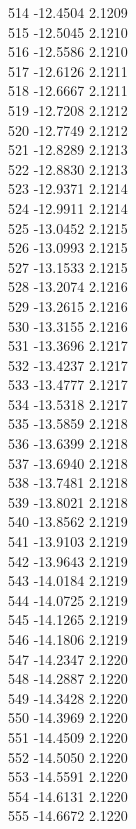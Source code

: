 \documentclass[11pt]{article}
\theoremstyle{definition}
\theoremstyle{plain}
\begin{document}
{514 -12.4504 2.1209\\
515 -12.5045 2.1210\\
516 -12.5586 2.1210\\
517 -12.6126 2.1211\\
518 -12.6667 2.1211\\
519 -12.7208 2.1212\\
520 -12.7749 2.1212\\
521 -12.8289 2.1213\\
522 -12.8830 2.1213\\
523 -12.9371 2.1214\\
524 -12.9911 2.1214\\
525 -13.0452 2.1215\\
526 -13.0993 2.1215\\
527 -13.1533 2.1215\\
528 -13.2074 2.1216\\
529 -13.2615 2.1216\\
530 -13.3155 2.1216\\
531 -13.3696 2.1217\\
532 -13.4237 2.1217\\
533 -13.4777 2.1217\\
534 -13.5318 2.1217\\
535 -13.5859 2.1218\\
536 -13.6399 2.1218\\
537 -13.6940 2.1218\\
538 -13.7481 2.1218\\
539 -13.8021 2.1218\\
540 -13.8562 2.1219\\
541 -13.9103 2.1219\\
542 -13.9643 2.1219\\
543 -14.0184 2.1219\\
544 -14.0725 2.1219\\
545 -14.1265 2.1219\\
546 -14.1806 2.1219\\
547 -14.2347 2.1220\\
548 -14.2887 2.1220\\
549 -14.3428 2.1220\\
550 -14.3969 2.1220\\
551 -14.4509 2.1220\\
552 -14.5050 2.1220\\
553 -14.5591 2.1220\\
554 -14.6131 2.1220\\
555 -14.6672 2.1220\\
}
\end{document}
